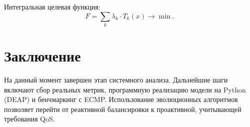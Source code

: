 \documentclass[10pt,twocolumn,a4paper]{article}
\begin{document}
Интегральная целевая функция:
\begin{equation}
F = \sum_k \lambda_k \cdot T_k(x) \to \min.
\end{equation}

\section{Заключение}
На данный момент завершен этап системного анализа. Дальнейшие шаги включают сбор реальных метрик, программную реализацию модели на Python (DEAP) и бенчмаркинг с ECMP. Использование эволюционных алгоритмов позволяет перейти от реактивной балансировки к проактивной, учитывающей требования QoS.
\end{document}
